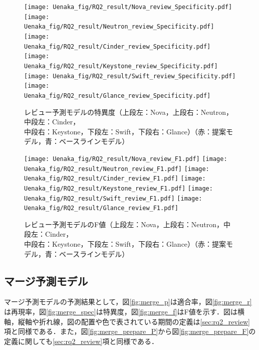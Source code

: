 \documentclass[submit]{ipsj}
\begin{document}
\begin{figure}[H]
\begin{minipage}{\textwidth}
\vspace{0.08\textheight}
\begin{center}
    \texttt{[image: Uenaka\_fig/RQ2\_result/Nova\_review\_Specificity.pdf]}
    \texttt{[image: Uenaka\_fig/RQ2\_result/Neutron\_review\_Specificity.pdf]}
    \texttt{[image: Uenaka\_fig/RQ2\_result/Cinder\_review\_Specificity.pdf]}
    \texttt{[image: Uenaka\_fig/RQ2\_result/Keystone\_review\_Specificity.pdf]}
    \texttt{[image: Uenaka\_fig/RQ2\_result/Swift\_review\_Specificity.pdf]}
    \texttt{[image: Uenaka\_fig/RQ2\_result/Glance\_review\_Specificity.pdf]}
    \caption{レビュー予測モデルの特異度（上段左：Nova，上段右：Neutron，中段左：Cinder，\\ 中段右：Keystone，下段左：Swift，下段右：Glance）（赤：提案モデル，青：ベースラインモデル）}
    \label{fig:review_spec}
\end{center}
\vspace{0.08\textheight}
\end{minipage}
\end{figure}

\begin{figure}[H]
\begin{center}
    \texttt{[image: Uenaka\_fig/RQ2\_result/Nova\_review\_F1.pdf]}
    \texttt{[image: Uenaka\_fig/RQ2\_result/Neutron\_review\_F1.pdf]}
    \texttt{[image: Uenaka\_fig/RQ2\_result/Cinder\_review\_F1.pdf]}
    \texttt{[image: Uenaka\_fig/RQ2\_result/Keystone\_review\_F1.pdf]}
    \texttt{[image: Uenaka\_fig/RQ2\_result/Swift\_review\_F1.pdf]}
    \texttt{[image: Uenaka\_fig/RQ2\_result/Glance\_review\_F1.pdf]}
    \caption{レビュー予測モデルのF値（上段左：Nova，上段右：Neutron，中段左：Cinder，\\ 中段右：Keystone，下段左：Swift，下段右：Glance）（赤：提案モデル，青：ベースラインモデル）}
    \label{fig:review_f}
\end{center}
\end{figure}


\subsection{マージ予測モデル}
マージ予測モデルの予測結果として，図\ref{fig:merge_p}は適合率，図\ref{fig:merge_r}は再現率，図\ref{fig:merge_spec}は特異度，図\ref{fig:merge_f}はF値を示す．図は横軸，縦軸や折れ線，図の配置や色で表されている期間の定義は\ref{sec:rq2_review}項と同様である．また，図\ref{fig:merge_prepare_P}から図\ref{fig:merge_prepare_F}の定義に関しても\ref{sec:rq2_review}項と同様である．
\end{document}
